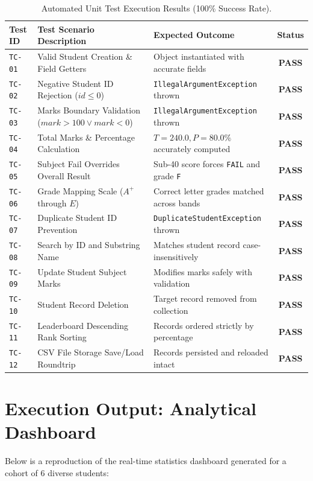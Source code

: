 \documentclass[12pt,a4paper]{report}
\begin{document}
\begin{table}[htbp]
\centering
\begin{tabularx}{\textwidth}{l X l c}
\toprule
\textbf{Test ID} & \textbf{Test Scenario Description} & \textbf{Expected Outcome} & \textbf{Status} \\
\midrule
\texttt{TC-01} & Valid Student Creation \& Field Getters & Object instantiated with accurate fields & \textbf{PASS} \\
\texttt{TC-02} & Negative Student ID Rejection ($id \le 0$) & \texttt{IllegalArgumentException} thrown & \textbf{PASS} \\
\texttt{TC-03} & Marks Boundary Validation ($mark > 100 \lor mark < 0$) & \texttt{IllegalArgumentException} thrown & \textbf{PASS} \\
\texttt{TC-04} & Total Marks \& Percentage Calculation & $T=240.0, P=80.0\%$ accurately computed & \textbf{PASS} \\
\texttt{TC-05} & Subject Fail Overrides Overall Result & Sub-40 score forces \texttt{FAIL} and grade \texttt{F} & \textbf{PASS} \\
\texttt{TC-06} & Grade Mapping Scale ($A^+$ through $E$) & Correct letter grades matched across bands & \textbf{PASS} \\
\texttt{TC-07} & Duplicate Student ID Prevention & \texttt{DuplicateStudentException} thrown & \textbf{PASS} \\
\texttt{TC-08} & Search by ID and Substring Name & Matches student record case-insensitively & \textbf{PASS} \\
\texttt{TC-09} & Update Student Subject Marks & Modifies marks safely with validation & \textbf{PASS} \\
\texttt{TC-10} & Student Record Deletion & Target record removed from collection & \textbf{PASS} \\
\texttt{TC-11} & Leaderboard Descending Rank Sorting & Records ordered strictly by percentage & \textbf{PASS} \\
\texttt{TC-12} & CSV File Storage Save/Load Roundtrip & Records persisted and reloaded intact & \textbf{PASS} \\
\bottomrule
\end{tabularx}
\caption{Automated Unit Test Execution Results (100\% Success Rate).}
\end{table}

\section{Execution Output: Analytical Dashboard}
Below is a reproduction of the real-time statistics dashboard generated for a cohort of 6 diverse students:
\end{document}
